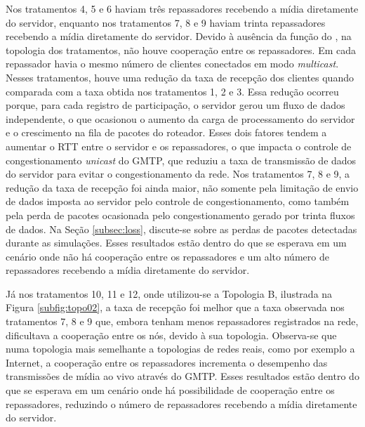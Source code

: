 Nos tratamentos 4, 5 e 6 haviam três repassadores recebendo a mídia diretamente do servidor, enquanto nos tratamentos 7, 8 e 9 haviam trinta repassadores recebendo a mídia diretamente do servidor.
Devido à ausência da função do , na topologia dos tratamentos, não houve cooperação entre os repassadores.
Em cada repassador havia o mesmo número de clientes conectados em modo \textit{multicast}. 
Nesses tratamentos, houve uma redução da taxa de recepção dos clientes quando comparada com a taxa obtida nos tratamentos 1, 2 e 3. Essa redução ocorreu porque, para cada registro de participação, o servidor gerou um fluxo de dados independente, o que ocasionou o aumento da carga de processamento do servidor e o crescimento na fila de pacotes do roteador. 
Esses dois fatores tendem a aumentar o RTT entre o servidor e os repassadores, o que impacta o controle de congestionamento \textit{unicast} do GMTP, que reduziu a taxa de transmissão de dados do servidor para evitar o congestionamento da rede.
Nos tratamentos 7, 8 e 9, a redução da taxa de recepção foi ainda maior, não somente pela limitação de envio de dados imposta ao servidor pelo controle de congestionamento, como também pela perda de pacotes ocasionada pelo congestionamento gerado por trinta fluxos de dados. 
Na Seção \ref{subsec:loss}, discute-se sobre as perdas de pacotes detectadas durante as simulações.
Esses resultados estão dentro do que se esperava em um cenário onde não há cooperação entre os repassadores e um alto número de repassadores recebendo a mídia diretamente do servidor.

Já nos tratamentos 10, 11 e 12, onde utilizou-se a Topologia B, ilustrada na Figura \ref{subfig:topo02}, a taxa de recepção foi melhor que a taxa observada nos tratamentos 7, 8 e 9 que, embora tenham menos repassadores registrados na rede, dificultava a cooperação entre os nós, devido à sua topologia.
Observa-se que numa topologia mais semelhante a topologias de redes reais, como por exemplo a Internet, a cooperação entre os repassadores incrementa o desempenho das transmissões de mídia ao vivo através do GMTP.
Esses resultados estão dentro do que se esperava em um cenário onde há possibilidade de cooperação entre os repassadores, reduzindo o número de repassadores recebendo a mídia diretamente do servidor.

